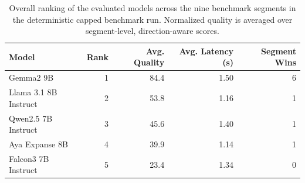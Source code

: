 \begin{table}[t]
\centering
\caption{Overall ranking of the evaluated models across the nine benchmark segments in the deterministic capped benchmark run. Normalized quality is averaged over segment-level, direction-aware scores.}
\label{tab:capped-overall-ranking}
\begin{tabular}{lrrrr}
\toprule
Model & Rank & Avg. Quality & Avg. Latency (s) & Segment Wins \\
\midrule
Gemma2 9B & 1 & 84.4 & 1.50 & 6 \\
Llama 3.1 8B Instruct & 2 & 53.8 & 1.16 & 1 \\
Qwen2.5 7B Instruct & 3 & 45.6 & 1.40 & 1 \\
Aya Expanse 8B & 4 & 39.9 & 1.14 & 1 \\
Falcon3 7B Instruct & 5 & 23.4 & 1.34 & 0 \\
\bottomrule
\end{tabular}
\end{table}
